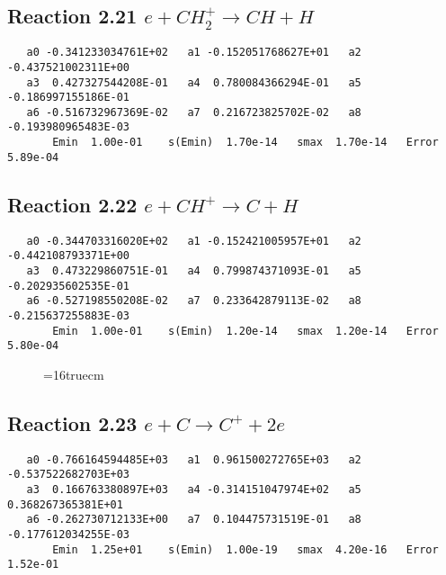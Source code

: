 \documentclass[12pt]{article}
\begin{document}
\subsection{ 
Reaction 2.21     $e + CH_2^+ \rightarrow CH + H$
}

\begin{small}\begin{verbatim}
   a0 -0.341233034761E+02   a1 -0.152051768627E+01   a2 -0.437521002311E+00
   a3  0.427327544208E-01   a4  0.780084366294E-01   a5 -0.186997155186E-01
   a6 -0.516732967369E-02   a7  0.216723825702E-02   a8 -0.193980965483E-03
       Emin  1.00e-01    s(Emin)  1.70e-14   smax  1.70e-14   Error  5.89e-04
\end{verbatim}\end{small}

\subsection{
Reaction 2.22     $e + CH^+ \rightarrow C + H$
}

\begin{small}\begin{verbatim} 
   a0 -0.344703316020E+02   a1 -0.152421005957E+01   a2 -0.442108793371E+00
   a3  0.473229860751E-01   a4  0.799874371093E-01   a5 -0.202935602535E-01
   a6 -0.527198550208E-02   a7  0.233642879113E-02   a8 -0.215637255883E-03
       Emin  1.00e-01    s(Emin)  1.20e-14   smax  1.20e-14   Error  5.80e-04
\end{verbatim}\end{small}

\begin{figure} \label{met.1_2.20}
\epsfxsize=16truecm
\end{figure}
\newpage
 
\subsection{ 
Reaction 2.23     $e + C \rightarrow C^+ + 2e$
}

\begin{small}\begin{verbatim} 
   a0 -0.766164594485E+03   a1  0.961500272765E+03   a2 -0.537522682703E+03
   a3  0.166763380897E+03   a4 -0.314151047974E+02   a5  0.368267365381E+01
   a6 -0.262730712133E+00   a7  0.104475731519E-01   a8 -0.177612034255E-03
       Emin  1.25e+01    s(Emin)  1.00e-19   smax  4.20e-16   Error  1.52e-01
\end{verbatim}\end{small}
\end{document}
